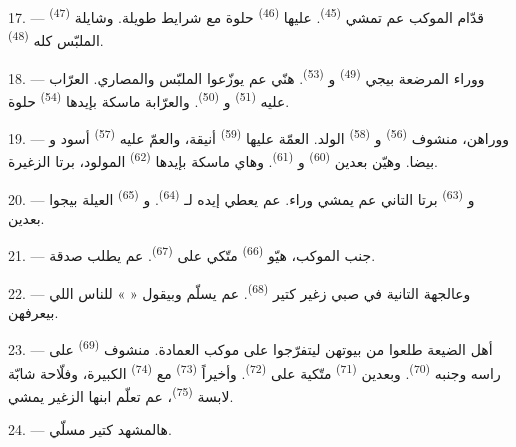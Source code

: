 \VUsaut{5.0mm}
\VUsaut{4.0mm}

17. --- قدّام الموكب عم تمشي  \textsuperscript{(45)}.
عليها  \textsuperscript{(46)} حلوة مع شرايط طويلة. وشايلة
 \textsuperscript{(47)} الملبّس كله 
\textsuperscript{(48)}.

18. --- ووراء المرضعة بيجي  \textsuperscript{(49)}
و \textsuperscript{(53)}. هنّي عم يوزّعوا الملبّس
والمصاري. العرّاب عليه  \textsuperscript{(51)}
و \textsuperscript{(50)}. والعرّابة ماسكة بإيدها
 \textsuperscript{(54)} حلوة.

19. --- ووراهن، منشوف  \textsuperscript{(56)}
و \textsuperscript{(58)} الولد. العمّة عليها
 \textsuperscript{(59)} أنيقة، والعمّ عليه
 \textsuperscript{(57)} أسود و بيضا. وهيّن
بعدين  \textsuperscript{(60)} و
\textsuperscript{(61)}. وهاي ماسكة بإيدها 
\textsuperscript{(62)} المولود، برتا الزغيرة.

20. --- و \textsuperscript{(63)} برتا التاني عم يمشي وراء.
عم يعطي إيده لـ \textsuperscript{(64)}. و
\textsuperscript{(65)} العيلة بيجوا بعدين.

\VUsaut{4.6mm}
\VUsaut{3.4mm}

21. --- جنب الموكب، هيّو  \textsuperscript{(66)} متّكي على
 \textsuperscript{(67)}. عم يطلب صدقة.

22. --- وعالجهة التانية في صبي زغير كتير 
\textsuperscript{(68)}. عم يسلّم وبيقول «  » للناس
اللي بيعرفهن.

23. --- أهل الضيعة طلعوا من بيوتهن ليتفرّجوا على موكب العمادة. منشوف
 \textsuperscript{(69)} على راسه 
وجنبه  \textsuperscript{(70)}. وبعدين 
\textsuperscript{(71)} متّكية على  \textsuperscript{(72)}.
وأخيراً  \textsuperscript{(73)} مع  \textsuperscript{(74)} الكبيرة، وفلّاحة شابّة لابسة
 \textsuperscript{(75)}، عم تعلّم ابنها الزغير يمشي.

24. --- هالمشهد كتير مسلّي.

